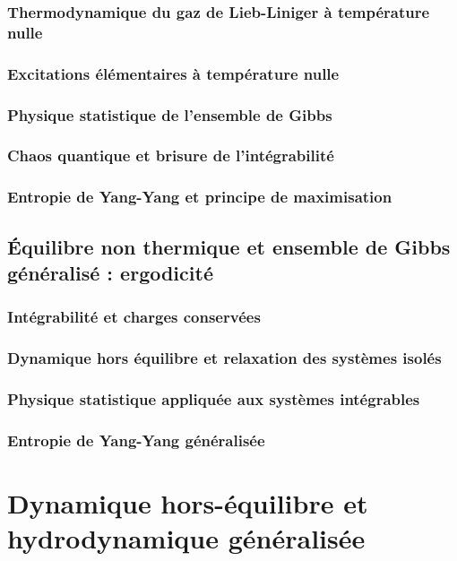 \section{Thermodynamique du gaz de Lieb-Liniger à température nulle}
\section{Excitations élémentaires à température nulle}

\section{Physique statistique de l’ensemble de Gibbs}

\section{Chaos quantique et brisure de l’intégrabilité}
\section{Entropie de Yang-Yang et principe de maximisation}

\chapter{Équilibre non thermique et ensemble de Gibbs généralisé : ergodicité}
\minitoc
\section{Intégrabilité et charges conservées}
\section{Dynamique hors équilibre et relaxation des systèmes isolés}
\section{Physique statistique appliquée aux systèmes intégrables}

\section{Entropie de Yang-Yang généralisée}

\part{Dynamique hors-équilibre et hydrodynamique généralisée}

